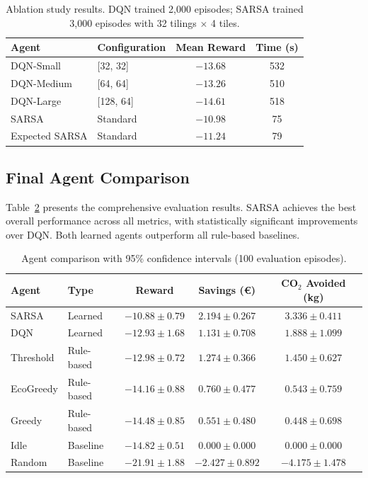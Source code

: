 \documentclass[runningheads]{llncs}
\begin{document}
\begin{table}[t]
\caption{Ablation study results. DQN trained 2,000 episodes; SARSA trained 3,000 episodes with 32 tilings $\times$ 4 tiles.}\label{tab:ablation}
\centering
\begin{tabular}{llcc}
\toprule
\textbf{Agent} & \textbf{Configuration} & \textbf{Mean Reward} & \textbf{Time (s)} \\
\midrule
DQN-Small & [32, 32] & $-13.68$ & 532 \\
DQN-Medium & [64, 64] & $\mathbf{-13.26}$ & 510 \\
DQN-Large & [128, 64] & $-14.61$ & 518 \\
\midrule
SARSA & Standard & $\mathbf{-10.98}$ & 75 \\
Expected SARSA & Standard & $-11.24$ & 79 \\
\bottomrule
\end{tabular}
\end{table}

\subsection{Final Agent Comparison}

Table~\ref{tab:comparison} presents the comprehensive evaluation results. SARSA achieves the best overall performance across all metrics, with statistically significant improvements over DQN. Both learned agents outperform all rule-based baselines.

\begin{table}[t]
\caption{Agent comparison with 95\% confidence intervals (100 evaluation episodes).}\label{tab:comparison}
\centering
\begin{tabular}{llccc}
\toprule
\textbf{Agent} & \textbf{Type} & \textbf{Reward} & \textbf{Savings (\euro{})} & \textbf{CO$_2$ Avoided (kg)} \\
\midrule
SARSA & Learned & $\mathbf{-10.88 \pm 0.79}$ & $\mathbf{2.194 \pm 0.267}$ & $\mathbf{3.336 \pm 0.411}$ \\
DQN & Learned & $-12.93 \pm 1.68$ & $1.131 \pm 0.708$ & $1.888 \pm 1.099$ \\
Threshold & Rule-based & $-12.98 \pm 0.72$ & $1.274 \pm 0.366$ & $1.450 \pm 0.627$ \\
EcoGreedy & Rule-based & $-14.16 \pm 0.88$ & $0.760 \pm 0.477$ & $0.543 \pm 0.759$ \\
Greedy & Rule-based & $-14.48 \pm 0.85$ & $0.551 \pm 0.480$ & $0.448 \pm 0.698$ \\
Idle & Baseline & $-14.82 \pm 0.51$ & $0.000 \pm 0.000$ & $0.000 \pm 0.000$ \\
Random & Baseline & $-21.91 \pm 1.88$ & $-2.427 \pm 0.892$ & $-4.175 \pm 1.478$ \\
\bottomrule
\end{tabular}
\end{table}
\end{document}
